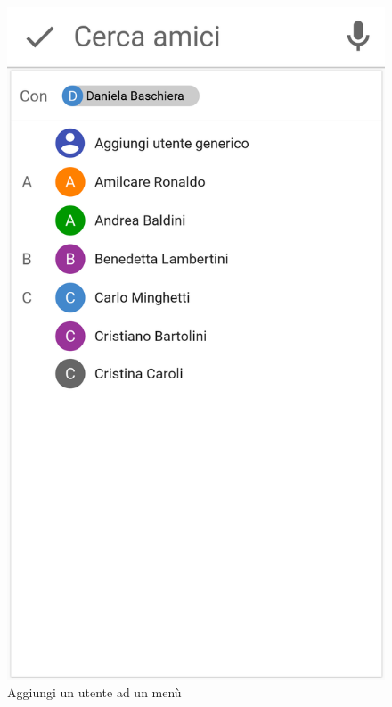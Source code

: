 \begin{figure}[H]
\begin{minipage}{.49\textwidth}
		\includegraphics[width=\textwidth]{img/wireframe/aggiungi_utente_daniela.png}
		\caption{Aggiungi un utente ad un menù}
	\end{minipage}
\end{figure}	
